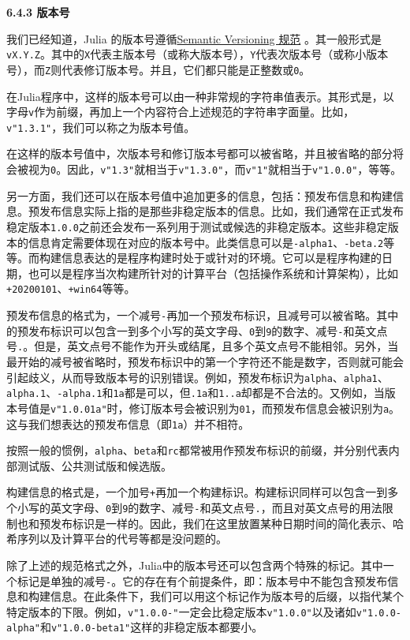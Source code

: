 \textbf{6.4.3 版本号}

我们已经知道，Julia 的版本号遵循\href{https://semver.org}{Semantic Versioning 规范} 。其一般形式是\verb`vX.Y.Z`。其中的\verb`X`代表主版本号（或称大版本号），\verb`Y`代表次版本号（或称小版本号），而\verb`Z`则代表修订版本号。并且，它们都只能是正整数或\verb`0`。

在Julia程序中，这样的版本号可以由一种非常规的字符串值表示。其形式是，以字母\verb`v`作为前缀，再加上一个内容符合上述规范的字符串字面量。比如，\verb`v"1.3.1"`，我们可以称之为版本号值。

在这样的版本号值中，次版本号和修订版本号都可以被省略，并且被省略的部分将会被视为\verb`0`。因此，\verb`v"1.3"`就相当于\verb`v"1.3.0"`，而\verb`v"1"`就相当于\verb`v"1.0.0"`，等等。

另一方面，我们还可以在版本号值中追加更多的信息，包括：预发布信息和构建信息。预发布信息实际上指的是那些非稳定版本的信息。比如，我们通常在正式发布稳定版本\verb`1.0.0`之前还会发布一系列用于测试或候选的非稳定版本。这些非稳定版本的信息肯定需要体现在对应的版本号中。此类信息可以是\verb`-alpha1`、\verb`-beta.2`等等。而构建信息表达的是程序构建时处于或针对的环境。它可以是程序构建的日期，也可以是程序当次构建所针对的计算平台（包括操作系统和计算架构），比如\verb`+20200101`、\verb`+win64`等等。

预发布信息的格式为，一个减号\verb`-`再加一个预发布标识，且减号可以被省略。其中的预发布标识可以包含一到多个小写的英文字母、\verb`0`到\verb`9`的数字、减号\verb`-`和英文点号\verb`.`。但是，英文点号不能作为开头或结尾，且多个英文点号不能相邻。另外，当最开始的减号被省略时，预发布标识中的第一个字符还不能是数字，否则就可能会引起歧义，从而导致版本号的识别错误。例如，预发布标识为\verb`alpha`、\verb`alpha1`、\verb`alpha.1`、\verb`-alpha.1`和\verb`1a`都是可以，但\verb`.1a`和\verb`1..a`却都是不合法的。又例如，当版本号值是\verb`v"1.0.01a"`时，修订版本号会被识别为\verb`01`，而预发布信息会被识别为\verb`a`。这与我们想表达的预发布信息（即\verb`1a`）并不相符。

按照一般的惯例，\verb`alpha`、\verb`beta`和\verb`rc`都常被用作预发布标识的前缀，并分别代表内部测试版、公共测试版和候选版。

构建信息的格式是，一个加号\verb`+`再加一个构建标识。构建标识同样可以包含一到多个小写的英文字母、\verb`0`到\verb`9`的数字、减号\verb`-`和英文点号\verb`.`，而且对英文点号的用法限制也和预发布标识是一样的。因此，我们在这里放置某种日期时间的简化表示、哈希序列以及计算平台的代号等都是没问题的。

除了上述的规范格式之外，Julia中的版本号还可以包含两个特殊的标记。其中一个标记是单独的减号\verb`-`。它的存在有个前提条件，即：版本号中不能包含预发布信息和构建信息。在此条件下，我们可以用这个标记作为版本号的后缀，以指代某个特定版本的下限。例如，\verb`v"1.0.0-"`一定会比稳定版本\verb`v"1.0.0"`以及诸如\verb`v"1.0.0-alpha"`和\verb`v"1.0.0-beta1"`这样的非稳定版本都要小。

